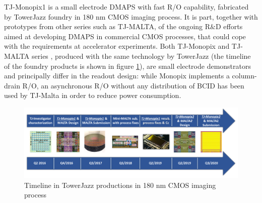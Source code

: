 TJ-Monopix1 is a small electrode DMAPS with fast R/O capability, fabricated by TowerJazz foundry in 180 nm CMOS imaging process.
It is part, together with prototypes from other series such as TJ-MALTA, of the ongoing R$\&$D efforts aimed at developing DMAPS in commercial CMOS processes, that could cope with the requirements at accelerator experiments.
Both TJ-Monopix and TJ-MALTA series \cite{MALTA}, produced with the same technology by TowerJazz (the timeline of the foundry products is shown in figure \ref{fig:TJ180nm}), are small electrode demonstrators and principally differ in the readout design: while Monopix implements a column-drain R/O, an asynchronous R/O without any distribution of BCID has been used by TJ-Malta in order to reduce power consumption.

\begin{figure}[h!]
    \centering
    \includegraphics[width=.95\linewidth]{figures/Monopix1/TJ180nm.png}
    \caption{Timeline in TowerJazz productions in 180 nm CMOS imaging process}
    \label{fig:TJ180nm}
\end{figure} 

